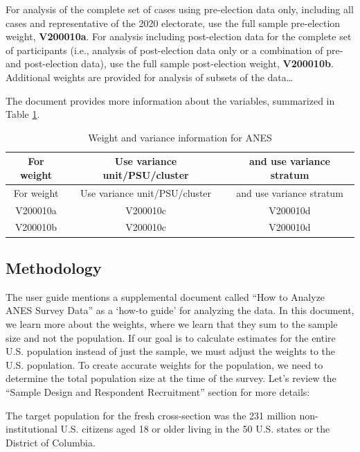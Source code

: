 \documentclass[
]{krantz}
\renewenvironment{quote}{\begin{VF}}{\end{VF}}
\begin{document}
\begin{quote}
For analysis of the complete set of cases using pre-election data only, including all cases and representative of the 2020 electorate, use the full sample pre-election weight, \textbf{V200010a}. For analysis including post-election data for the complete set of participants (i.e., analysis of post-election data only or a combination of pre- and post-election data), use the full sample post-election weight, \textbf{V200010b}. Additional weights are provided for analysis of subsets of the data\ldots{}
\end{quote}

The document provides more information about the variables, summarized in Table \ref{tab:aneswgts}.

\begin{longtable}[]{@{}ccc@{}}
\caption{\label{tab:aneswgts} Weight and variance information for ANES}\tabularnewline
\toprule\noalign{}
For weight & Use variance unit/PSU/cluster & and use variance stratum \\
\midrule\noalign{}
\endfirsthead
\toprule\noalign{}
For weight & Use variance unit/PSU/cluster & and use variance stratum \\
\midrule\noalign{}
\endhead
\bottomrule\noalign{}
\endlastfoot
V200010a & V200010c & V200010d \\
V200010b & V200010c & V200010d \\
\end{longtable}

\hypertarget{methodology}{%
\subsection*{Methodology}\label{methodology}}


The user guide mentions a supplemental document called ``How to Analyze ANES Survey Data'' \citep{debell} as a `how-to guide' for analyzing the data. In this document, we learn more about the weights, where we learn that they sum to the sample size and not the population. If our goal is to calculate estimates for the entire U.S. population instead of just the sample, we must adjust the weights to the U.S. population. To create accurate weights for the population, we need to determine the total population size at the time of the survey. Let's review the ``Sample Design and Respondent Recruitment'' section for more details:

\begin{quote}
The target population for the fresh cross-section was the 231 million non-institutional U.S. citizens aged 18 or older living in the 50 U.S. states or the District of Columbia.
\end{quote}
\end{document}
